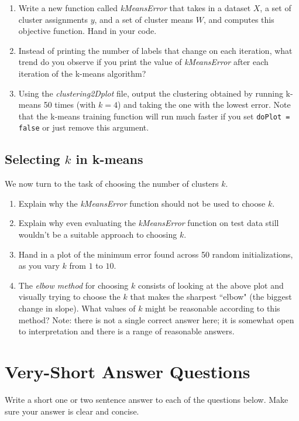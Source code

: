 \documentclass{article}
\def\blu#1{{\color{blu}#1}}
\def\enum#1{\begin{enumerate}#1\end{enumerate}}
\begin{document}
 \blu{\enum{
 \item Write a new function called \emph{kMeansError} that takes in a dataset $X$, a set of cluster assignments $y$, and a set of cluster means $W$, and computes this objective function. Hand in your code.
 \item Instead of printing the number of labels that change on each iteration, what trend do you observe if you print the value of \emph{kMeansError} after each iteration of the k-means algorithm?
 \item Using the \emph{clustering2Dplot} file, output the clustering obtained by running k-means 50 times (with $k=4$) and taking the one with the lowest error. Note that the k-means training function will run much faster if you set \texttt{doPlot = false} or just remove this argument.
 }}
 
 \subsection{Selecting $k$ in k-means}
 
 We now turn to the task of choosing the number of clusters $k$.
  
 \blu{\enum{
 \item Explain why the \emph{kMeansError} function should not be used to choose $k$.
 \item Explain why even evaluating the \emph{kMeansError} function on test data still wouldn't be a suitable approach to choosing $k$.
 \item Hand in a plot of the minimum error found across 50 random initializations, as you vary $k$ from $1$ to $10$.
 \item The \emph{elbow method} for choosing $k$ consists of looking at the above plot and visually trying to choose the $k$ that makes the sharpest ``elbow" (the biggest change in slope). What values of $k$ might be reasonable according to this method? Note: there is not a single correct answer here; it is somewhat open to interpretation and there is a range of reasonable answers.
 }}
 



\section{Very-Short Answer Questions}

\blu{Write a short one or two sentence answer to each of the questions below}. Make sure your answer is clear and concise.
\end{document}
